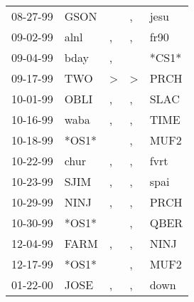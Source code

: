 \begin{supertabular}{p{0.07\textwidth}p{0.06\textwidth}p{0.02\textwidth}p{0.02\textwidth}p{0.06\textwidth}}
          08-27-99\textsuperscript{} &           GSON\textsuperscript{} &                  &                , &           jesu\textsuperscript{} \\
          09-02-99\textsuperscript{} &           alnl\textsuperscript{} &                , &                , &           fr90\textsuperscript{} \\
          09-04-99\textsuperscript{} &           bday\textsuperscript{} &                , &                  &                            *CS1* \\
          09-17-99\textsuperscript{} &            TWO\textsuperscript{} &     \textgreater &     \textgreater &           PRCH\textsuperscript{} \\
          10-01-99\textsuperscript{} &           OBLI\textsuperscript{} &                , &                , &           SLAC\textsuperscript{} \\
          10-16-99\textsuperscript{} &           waba\textsuperscript{} &                , &                , &           TIME\textsuperscript{} \\
          10-18-99\textsuperscript{} &                            *OS1* &                  &                , &           MUF2\textsuperscript{} \\
          10-22-99\textsuperscript{} &           chur\textsuperscript{} &                , &                , &           fvrt\textsuperscript{} \\
          10-23-99\textsuperscript{} &           SJIM\textsuperscript{} &                , &                , &           spai\textsuperscript{} \\
          10-29-99\textsuperscript{} &           NINJ\textsuperscript{} &                , &                , &           PRCH\textsuperscript{} \\
          10-30-99\textsuperscript{} &                            *OS1* &                  &                , &           QBER\textsuperscript{} \\
          12-04-99\textsuperscript{} &           FARM\textsuperscript{} &                , &                , &           NINJ\textsuperscript{} \\
          12-17-99\textsuperscript{} &                            *OS1* &                  &                , &           MUF2\textsuperscript{} \\
          01-22-00\textsuperscript{} &           JOSE\textsuperscript{} &                , &                , &           down\textsuperscript{} \\

\end{supertabular}
